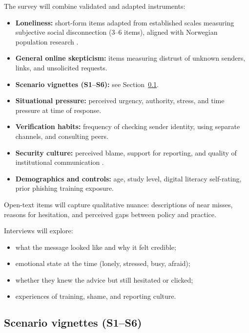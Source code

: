 \documentclass[UKenglish,12pt]{master-style}
\begin{document}
The survey will combine validated and adapted instruments:

\begin{itemize}
    \item \textbf{Loneliness:} short-form items adapted from established scales measuring subjective social disconnection (3--6 items), aligned with Norwegian population research \parencite{ssb2025loneliness,nicholson2021loneliness}.
    \item \textbf{General online skepticism:} items measuring distrust of unknown senders, links, and unsolicited requests.
    \item \textbf{Scenario vignettes (S1--S6):} see Section~\ref{sec:vignettes}.
    \item \textbf{Situational pressure:} perceived urgency, authority, stress, and time pressure at time of response.
    \item \textbf{Verification habits:} frequency of checking sender identity, using separate channels, and consulting peers.
    \item \textbf{Security culture:} perceived blame, support for reporting, and quality of institutional communication \parencite{baylsmith2024phishing,chen2024roleplaying}.
    \item \textbf{Demographics and controls:} age, study level, digital literacy self-rating, prior phishing training exposure.
\end{itemize}

Open-text items will capture qualitative nuance: descriptions of near misses, reasons for hesitation, and perceived gaps between policy and practice.

Interviews will explore:
\begin{itemize}
    \item what the message looked like and why it felt credible;
    \item emotional state at the time (lonely, stressed, busy, afraid);
    \item whether they knew the advice but still hesitated or clicked;
    \item experiences of training, shame, and reporting culture.
\end{itemize}

\subsection{Scenario vignettes (S1--S6)}
\label{sec:vignettes}
\end{document}

